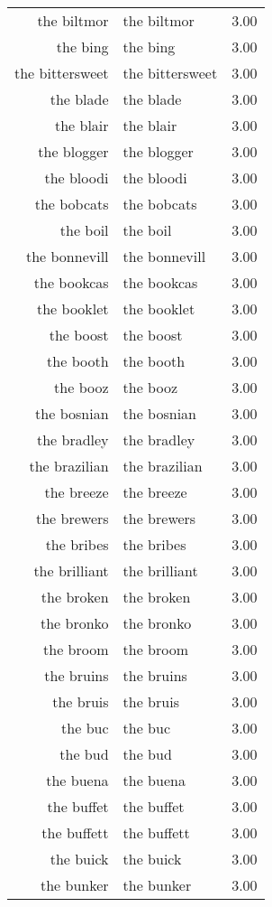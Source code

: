 \begin{table}[ht]
\begin{tabular}{rlr}
  the biltmor & the biltmor & 3.00 \\ 
  the bing & the bing & 3.00 \\ 
  the bittersweet & the bittersweet & 3.00 \\ 
  the blade & the blade & 3.00 \\ 
  the blair & the blair & 3.00 \\ 
  the blogger & the blogger & 3.00 \\ 
  the bloodi & the bloodi & 3.00 \\ 
  the bobcats & the bobcats & 3.00 \\ 
  the boil & the boil & 3.00 \\ 
  the bonnevill & the bonnevill & 3.00 \\ 
  the bookcas & the bookcas & 3.00 \\ 
  the booklet & the booklet & 3.00 \\ 
  the boost & the boost & 3.00 \\ 
  the booth & the booth & 3.00 \\ 
  the booz & the booz & 3.00 \\ 
  the bosnian & the bosnian & 3.00 \\ 
  the bradley & the bradley & 3.00 \\ 
  the brazilian & the brazilian & 3.00 \\ 
  the breeze & the breeze & 3.00 \\ 
  the brewers & the brewers & 3.00 \\ 
  the bribes & the bribes & 3.00 \\ 
  the brilliant & the brilliant & 3.00 \\ 
  the broken & the broken & 3.00 \\ 
  the bronko & the bronko & 3.00 \\ 
  the broom & the broom & 3.00 \\ 
  the bruins & the bruins & 3.00 \\ 
  the bruis & the bruis & 3.00 \\ 
  the buc & the buc & 3.00 \\ 
  the bud & the bud & 3.00 \\ 
  the buena & the buena & 3.00 \\ 
  the buffet & the buffet & 3.00 \\ 
  the buffett & the buffett & 3.00 \\ 
  the buick & the buick & 3.00 \\ 
  the bunker & the bunker & 3.00 \\ 

\end{tabular}
\end{table}
